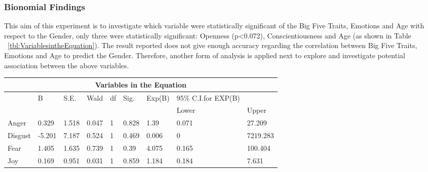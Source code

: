 \documentclass{llncs}
\begin{document}
\subsubsection{Bionomial Findings}
This aim of this experiment is to investigate which variable were statistically significant of the Big Five Traits, Emotions and Age with respect to the Gender, only three were statistically significant: Openness (p<0.072), Conscientiousness and Age (as shown in Table ~\ref{tbl:VariablesintheEquation}). The result reported does not give enough accuracy regarding the correlation between Big Five Traits, Emotions and Age to predict the Gender. Therefore, another form of analysis is applied next to explore and investigate potential association between the above variables.

\begin{table}[!ht]
\centering
\begin{tabular}{@{}lllllllll@{}}
\toprule
\multicolumn{9}{c}{\textbf{Variables in the Equation}}                                                                                                                                          \\ \midrule
                  & \multirow{2}{*}{B} & \multirow{2}{*}{S.E.} & \multirow{2}{*}{Wald} & \multirow{2}{*}{df} & \multirow{2}{*}{Sig.} & \multirow{2}{*}{Exp(B)} & 95\% C.I.for EXP(B) &          \\
                  &                    &                       &                       &                     &                       &                         & Lower               & Upper    \\
Anger             & 0.329              & 1.518                 & 0.047                 & 1                   & 0.828                 & 1.39                    & 0.071               & 27.209   \\
Disgust           & -5.201             & 7.187                 & 0.524                 & 1                   & 0.469                 & 0.006                   & 0                   & 7219.283 \\
Fear              & 1.405              & 1.635                 & 0.739                 & 1                   & 0.39                  & 4.075                   & 0.165               & 100.404  \\
Joy               & 0.169              & 0.951                 & 0.031                 & 1                   & 0.859                 & 1.184                   & 0.184               & 7.631    \\

\end{tabular}
\end{table}
\end{document}
